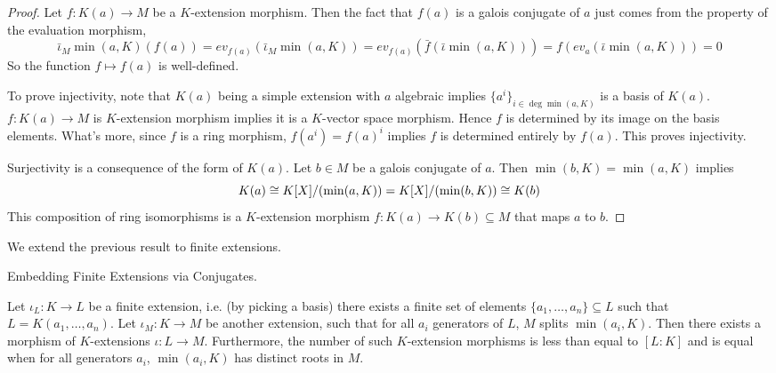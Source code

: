 \documentclass[../book.tex]{subfiles}
\begin{document}
\begin{proof}
    Let $f : K(a) \to M$ be a $K$-extension morphism. 
    Then the fact that $f(a)$ is a galois conjugate of $a$ just comes from
    the property of the evaluation morphism, 
    \[
        \bar\iota_M \min(a,K) (f(a)) = ev_{f(a)}(\bar\iota_M \min(a,K))
        = ev_{f(a)} (\bar{f}(\bar\iota \min(a,K))) 
        = f(ev_a (\bar\iota \min(a,K))) = 0
    \]
    So the function $f \mapsto f(a)$ is well-defined. 
    
    To prove injectivity, note that $K(a)$ being a simple extension with
    $a$ algebraic implies $\{a^i\}_{i\in\deg\min(a,K)}$ is a basis of $K(a)$. 
    $f : K(a) \to M$ is $K$-extension morphism implies 
    it is a $K$-vector space morphism. 
    Hence $f$ is determined by its image on the basis elements. 
    What's more, since $f$ is a ring morphism, 
    $f(a^i) = f(a)^i$ implies $f$ is determined entirely by $f(a)$. 
    This proves injectivity. 
    
    Surjectivity is a consequence of the form of $K(a)$.
    Let $b \in M$ be a galois conjugate of $a$. 
    Then $\min(b,K) = \min(a,K)$ implies \[
        K(a) \cong K[X]/(\min(a,K)) = K[X]/(\min(b,K)) \cong K(b)
    \]
    This composition of ring isomorphisms is a $K$-extension morphism 
    $f : K(a) \to K(b) \subseteq M$ that maps $a$ to $b$. 
\end{proof}
\begin{rmk}
    We extend the previous result to finite extensions. 
\end{rmk}
\begin{thm} Embedding Finite Extensions via Conjugates.
    
    Let $\iota_L : K \to L$ be a finite extension, i.e. (by picking a basis)
    there exists a finite set of elements $\{a_1,\dots,a_n\} \subseteq L$ such that 
    $L = K(a_1, \dots, a_n)$. 
    Let $\iota_M : K \to M$ be another extension, such that 
    for all $a_i$ generators of $L$, $M$ splits $\min(a_i,K)$. 
    Then there exists a morphism of $K$-extensions $\iota : L \to M$.
    Furthermore, the number of such $K$-extension morphisms is less than equal
    to $[L : K]$ and is equal when for all generators $a_i$, 
    $\min(a_i,K)$ has distinct roots in $M$. 
\end{thm}
\end{document}
